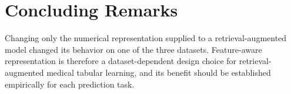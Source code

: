 \documentclass[11pt,a4paper,oneside, openany, reqno, chapter, nokorean]{oblivoir}
\theoremstyle{definition}
\theoremstyle{remark}
\numberwithin{equation}{chapter}
\theoremstyle{definition}
\theoremstyle{remark}
\theoremstyle{definition}
\begin{document}
\section{Concluding Remarks}

Changing only the numerical representation supplied to a retrieval-augmented
model changed its behavior on one of the three datasets. Feature-aware
representation is therefore a dataset-dependent design choice for
retrieval-augmented medical tabular learning, and its benefit should be
established empirically for each prediction task.
    
    
    
    
    \pagestyle{plain}%
	\clearpage
 
  
  

  
 
  \cedp
  
  \cedp
  
\end{document}
